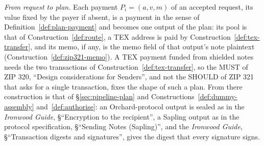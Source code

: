 \documentclass[11pt,a4paper]{article}
\theoremstyle{definition}
\begin{document}
\emph{From request to plan.} Each payment $P_i = (a, v, m)$ of an accepted
request, its value fixed by the payer if absent, is a payment in the sense
of Definition~\ref{def:plan-payment} and becomes one output of the plan:
its pool is that of Construction~\ref{def:route}, a TEX address is paid by
Construction~\ref{def:tex-transfer}, and its memo, if any, is the memo
field of that output's note plaintext (Construction~\ref{def:zip321-memo}).
A TEX payment funded from shielded notes needs the two transactions of
Construction~\ref{def:tex-transfer}, so the MUST of ZIP 320, ``Design
considerations for Senders'', and not the SHOULD of ZIP 321 that asks for a
single transaction, fixes the shape of such a plan. From there construction
is that of \S\ref{sec:pipeline-plan} and Constructions~\ref{def:dummy-assembly}
and~\ref{def:authorise}: an Orchard-protocol output is sealed as in the
\emph{Ironwood Guide}, \S``Encryption to the recipient'', a Sapling output as
in the protocol specification, \S``Sending Notes (Sapling)'', and the
\emph{Ironwood Guide}, \S``Transaction digests and signatures'', gives the
digest that every signature signs.
\end{document}
